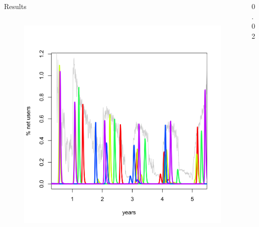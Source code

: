 \documentclass[final]{beamer} %
\newcommand{\spaceProp}{0.02}
\newcommand{\spacer}{\begin{column}{\spaceProp\paperwidth}\end{column}}
\newenvironment{oneCol}{\begin{column}[t]{0.225\paperwidth}}{\end{column}}
\newenvironment{threeCol}{\begin{column}[t]{0.715\paperwidth}}{\end{column}}
\begin{document}
\begin{frame}{}
\begin{columns}[t]
\begin{threeCol}
\begin{block}{Results}
\begin{columns}
\begin{oneCol}
\begin{figure}
      \end{figure}  
      \begin{figure}
        \includegraphics[width=1.0\linewidth]{out365.png}
      \end{figure}  
    \end{oneCol}
    \end{columns}
    
    
    \end{block}
    
    \end{threeCol}
    \spacer{}
    \end{columns}
  \end{frame}
  
\end{document}
